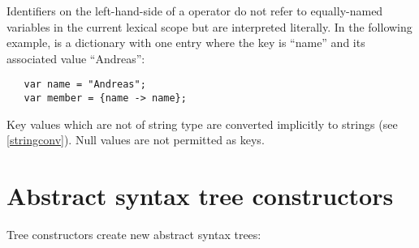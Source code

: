 \noindent
Identifiers on the left-hand-side of a \token{->} operator do not
refer to equally-named variables in the current lexical scope but are
interpreted literally. In the following example,  is a
dictionary with one entry where the key is ``name'' and its associated
value ``Andreas'':

\begin{lstlisting}
   var name = "Andreas";
   var member = {name -> name};
\end{lstlisting}

\noindent
Key values which are not of string type are converted implicitly
to strings (see \ref{stringconv}). Null values are not permitted
as keys.

\section{Abstract syntax tree constructors}\label{treecon}

Tree constructors create new abstract syntax trees:

\begin{grammar}
      \produces \lextoken{<(}  \lextoken{)>} \\
      \produces \lextoken{<(} 
	  \lextoken{)>} \\
      \produces {} \\
      \produces {}  \\
      \produces {} \\
      \produces {}
	   \\
      \produces \lextoken{\{}  \lextoken{\}} \\
      \produces \lextoken{\{}  \lextoken{\}}
	   \\
      \produces \lextoken{\{}  \lextoken{\}}
	  \\
      \produces \lextoken{\{}  \lextoken{\}}
	    \\
      \produces \lextoken{(} 
	 \lextoken{)} \\
      \produces \lextoken{(} 
	  \lextoken{)} \\
      \produces {} \\
      \produces {}
	  \\
\end{grammar}

